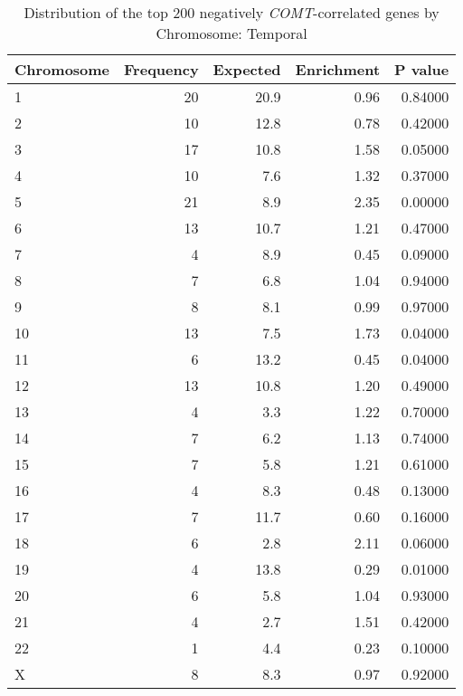 \begin{longtable}{lrrrr}
\caption{Distribution of the top 200 negatively \textit{COMT}-correlated genes by \\ Chromosome: Temporal} \\ 
  \toprule
Chromosome & Frequency & Expected & Enrichment & P value \\ 
  \midrule
1 & 20 & 20.9 & 0.96 & 0.84000 \\ 
  2 & 10 & 12.8 & 0.78 & 0.42000 \\ 
  3 & 17 & 10.8 & 1.58 & 0.05000 \\ 
  4 & 10 & 7.6 & 1.32 & 0.37000 \\ 
  5 & 21 & 8.9 & 2.35 & 0.00000 \\ 
  6 & 13 & 10.7 & 1.21 & 0.47000 \\ 
  7 & 4 & 8.9 & 0.45 & 0.09000 \\ 
  8 & 7 & 6.8 & 1.04 & 0.94000 \\ 
  9 & 8 & 8.1 & 0.99 & 0.97000 \\ 
  10 & 13 & 7.5 & 1.73 & 0.04000 \\ 
  11 & 6 & 13.2 & 0.45 & 0.04000 \\ 
  12 & 13 & 10.8 & 1.20 & 0.49000 \\ 
  13 & 4 & 3.3 & 1.22 & 0.70000 \\ 
  14 & 7 & 6.2 & 1.13 & 0.74000 \\ 
  15 & 7 & 5.8 & 1.21 & 0.61000 \\ 
  16 & 4 & 8.3 & 0.48 & 0.13000 \\ 
  17 & 7 & 11.7 & 0.60 & 0.16000 \\ 
  18 & 6 & 2.8 & 2.11 & 0.06000 \\ 
  19 & 4 & 13.8 & 0.29 & 0.01000 \\ 
  20 & 6 & 5.8 & 1.04 & 0.93000 \\ 
  21 & 4 & 2.7 & 1.51 & 0.42000 \\ 
  22 & 1 & 4.4 & 0.23 & 0.10000 \\ 
  X & 8 & 8.3 & 0.97 & 0.92000 \\ 
   \bottomrule
\end{longtable}
